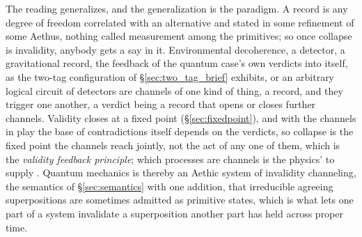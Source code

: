 \documentclass[11pt]{article}
\theoremstyle{definition}
\newcommand{\Aethus}{Aethus}
\begin{document}
The reading generalizes, and the generalization is the paradigm. A record is any degree of freedom correlated with an alternative and stated in some refinement of some \Aethus{}, nothing called measurement among the primitives; so once collapse is invalidity, anybody gets a say in it. Environmental decoherence, a detector, a gravitational record, the feedback of the quantum case's own verdicts into itself, as the two-tag configuration of \S\ref{sec:two_tag_brief} exhibits, or an arbitrary logical circuit of detectors are channels of one kind of thing, a record, and they trigger one another, a verdict being a record that opens or closes further channels. Validity closes at a fixed point (\S\ref{sec:fixedpoint}), and with the channels in play the base of contradictions itself depends on the verdicts, so collapse is the fixed point the channels reach jointly, not the act of any one of them, which is the \emph{validity feedback principle}; which processes are channels is the physics' to supply \cite{Aethus, AethusQuant}. Quantum mechanics is thereby an Aethic system of invalidity channeling, the semantics of \S\ref{sec:semantics} with one addition, that irreducible agreeing superpositions are sometimes admitted as primitive states, which is what lets one part of a system invalidate a superposition another part has held across proper time.
\end{document}
